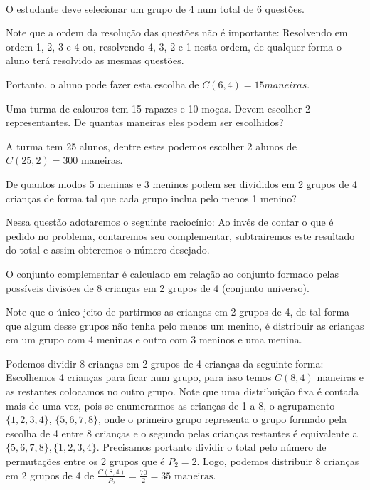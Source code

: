 \documentclass[a4paper, 12pt, addpoints]{exam}
\begin{document}
\begin{questions}
\begin{resp}~

  O estudante deve selecionar um grupo de 4 num total de 6 questões.

  Note que a ordem da resolução das questões não é importante: Resolvendo em ordem 1, 2, 3 e 4 ou, resolvendo 4, 3, 2 e 1 nesta ordem, de qualquer forma o aluno terá resolvido as mesmas questões.

  Portanto, o aluno pode fazer esta escolha de $C(6,4) = 15 maneiras$.
\end{resp}

\question Uma turma de calouros tem 15 rapazes e 10 moças. Devem escolher 2
representantes. De quantas maneiras eles podem ser escolhidos?

\begin{resp}

  A turma tem 25 alunos, dentre estes podemos escolher 2 alunos de $C(25,2) = 300$ maneiras.
\end{resp}

\question De quantos modos 5 meninas e 3 meninos podem ser divididos em 2
grupos de 4 crianças de forma tal que cada grupo inclua pelo menos 1
menino?

\begin{resp}
  
  Nessa questão adotaremos o seguinte raciocínio: Ao invés de contar o que é pedido no problema, contaremos seu complementar, subtrairemos este resultado do total e assim obteremos o número desejado.

O conjunto complementar é calculado em relação ao conjunto formado pelas possíveis divisões de 8 crianças em 2 grupos de 4 (conjunto universo).

Note que o único jeito de partirmos as crianças em 2 grupos de 4, de tal forma que algum desse grupos não tenha pelo menos um menino, é distribuir as crianças em um grupo com 4 meninas e outro com 3 meninos e uma menina.

Podemos dividir 8 crianças em 2 grupos de 4 crianças da seguinte forma: Escolhemos 4 crianças para ficar num grupo, para isso temos $C(8,4)$ maneiras e as restantes colocamos no outro grupo. Note que uma distribuição fixa é contada mais de uma vez, pois se enumerarmos as crianças de 1 a 8, o agrupamento $\{1,2,3,4\}$, $\{5,6,7,8\}$, onde o primeiro grupo representa o grupo formado pela escolha de 4 entre 8 crianças e o segundo pelas crianças restantes é equivalente a $\{5,6,7,8\}, \{1,2,3,4\}$. Precisamos portanto dividir o total pelo número de permutações entre os 2 grupos que é $P_2 = 2$. Logo, podemos distribuir 8 crianças em 2 grupos de 4 de $\frac{C(8,4)}{P_2} = \frac{70}{2} = 35 \text{ maneiras}.$


\end{resp}
\end{questions}
\end{document}
